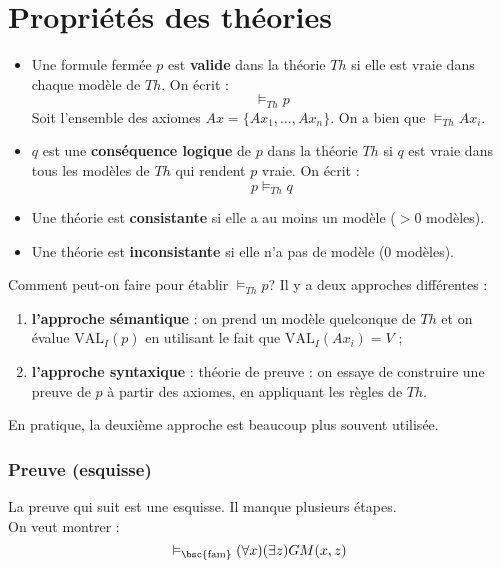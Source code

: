 \section{Propriétés des théories}
\begin{itemize}
\item Une formule fermée $p$ est \textbf{valide} dans la théorie $Th$ si elle est vraie dans chaque modèle de $Th$. On écrit : 
$$\vDash_{Th} p$$
Soit l'ensemble des axiomes $Ax=\{Ax_1, \hdots, Ax_n\}$. On a bien que $\vDash_{Th} Ax_i$.\\
\item $q$ est une \textbf{conséquence logique} de $p$ dans la théorie $Th$ si $q$ est vraie dans tous les modèles de $Th$ qui rendent $p$ vraie. On écrit :  
$$p \vDash_{Th} q$$
\item Une théorie est \textbf{consistante} si elle a au moins un modèle ($>0$ modèles).
\item Une théorie est \textbf{inconsistante} si elle n'a pas de modèle ($0$ modèles).\\
\end{itemize}

Comment peut-on faire pour établir $\vDash_{Th} p$? Il y a deux approches différentes :
\begin{enumerate}
\item \textbf{l'approche sémantique} : on prend un modèle quelconque de $Th$ et on évalue $\text{VAL}_I (p)$ en utilisant le fait que $\text{VAL}_I (Ax_i)=V$ ;
\item \textbf{l'approche syntaxique} : théorie de preuve : on essaye de construire une preuve de $p$ à partir des axiomes, en appliquant les règles de $Th$.\\
\end{enumerate}
En pratique, la deuxième approche est beaucoup plus souvent utilisée.\\


\subsubsection{Preuve (esquisse)}
La preuve qui suit est une esquisse. Il manque plusieurs étapes.\\
On veut montrer  : 
$$\vDash_{\text{\bsc{fam}}} (\forall x)(\exists z) GM(x,z)$$

